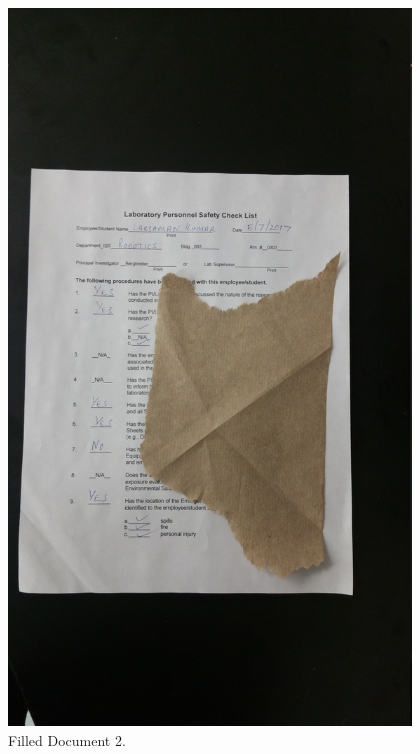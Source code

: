\begin{figure}[th]
	\centering
	\includegraphics[height=19cm ]{Figures/filled_document2}
	\caption[Filled Document 2]{Filled Document 2.}
	\label{fig:FilledDocument2}
\end{figure}
\pagebreak
